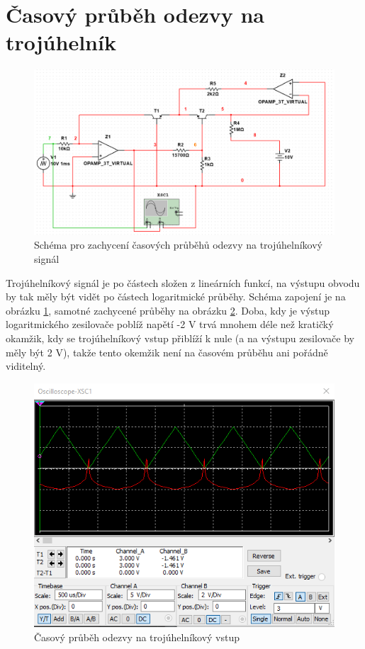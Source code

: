 \documentclass[twoside]{article}
\begin{document}
\section{Časový průběh odezvy na trojúhelník}

\begin{figure}[h!]
    \centering
    \includegraphics[width=0.65\linewidth]{prubeh_schema.png}
    \caption{Schéma pro zachycení časových průběhů odezvy na trojúhelníkový signál}
    \label{fig:prubeh_schema}
\end{figure}

Trojúhelníkový signál je po částech složen z lineárních funkcí,
na výstupu obvodu by tak měly být vidět po částech logaritmické průběhy.
Schéma zapojení je na obrázku \ref{fig:prubeh_schema}, samotné zachycené 
průběhy na obrázku \ref{fig:prubeh}.
Doba, kdy je výstup logaritmického zesilovače poblíž napětí -2 V trvá
mnohem déle než kratičký okamžik, kdy se trojúhelníkový vstup přiblíží k nule
(a na výstupu zesilovače by měly být 2 V), takže tento okemžik není na časovém průběhu
ani pořádně viditelný.

\begin{figure}[h!]
    \centering
    \includegraphics[width=0.65\linewidth]{prubeh.png}
    \caption{Časový průběh odezvy na trojúhelníkový vstup}
    \label{fig:prubeh}
\end{figure}
\end{document}
